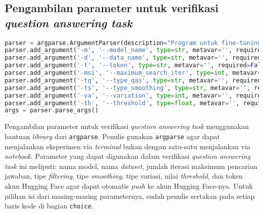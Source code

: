 \subsection{Pengambilan parameter untuk verifikasi \emph{question answering task}}
\begin{lstlisting}[language=Python, caption=Pengambilan parameter untuk \emph{training question answering task}]
parser = argparse.ArgumentParser(description="Program untuk fine-tuning dataset QA")
parser.add_argument('-m', '--model_name', type=str, metavar='', required=True, help="Nama model Anda; String; choice=[indolem, indonlu, xlmr, your model choice]")
parser.add_argument('-d', '--data_name', type=str, metavar='', required=True, help="Nama dataset Anda; String; choice=[squadid, idkmrc, tydiqaid]")
parser.add_argument('-t', '--token', type=str, metavar='', required=False, help="Token Hugging Face Anda; String; choice=[all string token]; default=(TOKEN_HF_muhammadravi251001)", default="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")
parser.add_argument('-msi', '--maximum_search_iter', type=int, metavar='', required=False, help="Jumlah maximum search iter Anda; Integer; choice=[all integer]; default=2", default=2)
parser.add_argument('-tq', '--type_qas', type=str, metavar='', required=False, help="Tipe filtering QAS Anda; String; choice=[entailment_only, entailment_or_neutral]; default=entailment_or_neutral", default="entailment_or_neutral")
parser.add_argument('-ts', '--type_smoothing', type=str, metavar='', required=False, help="Tipe smoothing hypothesis Anda; String; choice=[replace_first, replace_question_mark, add_adalah, just_concat_answer_and_question, rule_based, machine_generation_with_rule_based, pure_machine_generation, machine_generation_with_translation]; default=rule_based", default="rule_based")
parser.add_argument('-va', '--variation', type=int, metavar='', required=False, help="Jenis variasi filtering Anda; Integer; choice=[1, 2, 3]; default=1", default=1)
parser.add_argument('-th', '--threshold', type=float, metavar='', required=False, help="Berapa threshold skor confidence filtering Anda; Integer; choice=[all integer]; default=0.5", default=0.5)
args = parser.parse_args()
\end{lstlisting}

Pengambilan parameter untuk verifikasi \emph{question answering task} menggunakan bantuan \emph{library} dari \texttt{argparse}. Penulis gunakan \texttt{argparse} agar dapat menjalankan eksperimen via \emph{terminal} bukan dengan satu-satu menjalankan via \emph{notebook}. Parameter yang dapat digunakan dalam verifikasi \emph{question answering task} ini meliputi: nama model, nama \emph{dataset}, jumlah iterasi maksimum pencarian jawaban, tipe \emph{filtering}, tipe \emph{smoothing}, tipe variasi, nilai \emph{threshold}, dan token akun Hugging Face agar dapat otomatis \emph{push} ke akun Hugging Face-nya. Untuk pilihan isi dari masing-masing parameternya, sudah penulis sertakan pada setiap baris kode di bagian \texttt{choice}.

